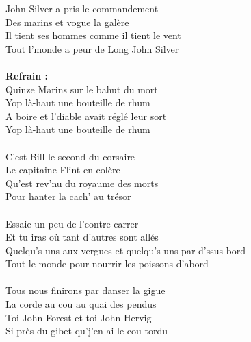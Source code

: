 
 John Silver a pris le commandement
\\Des marins et vogue la galère
\\Il tient ses hommes comme il tient le vent
\\Tout l'monde a peur de Long John Silver
\\\\\textbf{Refrain :}
\\Quinze Marins sur le bahut du mort
\\Yop là-haut une bouteille de rhum
\\A boire et l'diable avait réglé leur sort
\\Yop là-haut une bouteille de rhum
\\\\C'est Bill le second du corsaire
\\Le capitaine Flint en colère
\\Qu'est rev'nu du royaume des morts
\\Pour hanter la cach' au trésor
\\\\Essaie un peu de l'contre-carrer
\\Et tu iras où tant d'autres sont allés
\\Quelqu's uns aux vergues et quelqu's uns par d'ssus bord
\\Tout le monde pour nourrir les poissons d'abord
\\\\Tous nous finirons par danser la gigue
\\La corde au cou au quai des pendus
\\Toi John Forest et toi John Hervig
\\Si près du gibet qu'j'en ai le cou tordu
\breakpage